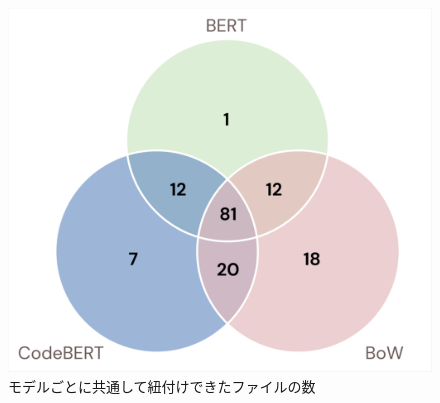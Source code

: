 \documentclass[submit]{ipsj}
\begin{document}
\begin{figure}[t]
 	\centering
    		\includegraphics[width=0.8\linewidth]{./IPSJ202303_Ishioka/benz.pdf}
	\caption{モデルごとに共通して紐付けできたファイルの数}
	\label{fig:oss_developments}
\end{figure}









%
\end{document}

